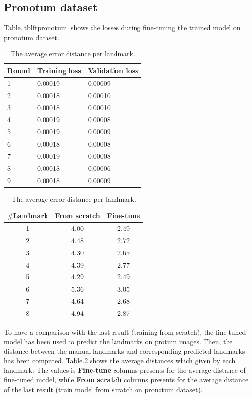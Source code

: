\documentclass[12pt,a4paper]{article}
\begin{document}
\subsection{Pronotum dataset}
Table.\ref{tblftpronotum} shows the losses during fine-tuning the trained model on pronotum dataset.
\begin{table}[htbp]
\begin{minipage}[b]{.5\textwidth}
	\centering
	\begin{tabular}{l l l}
	Round & Training loss & Validation loss \\ \hline
	1 & 0.00019 & 0.00009  \\ \hline
	2 & 0.00018 & 0.00010 \\ \hline
	3 & 0.00018 & 0.00010 \\ \hline
	4 & 0.00019 & 0.00008 \\ \hline
	5 & 0.00019 & 0.00009 \\ \hline
	6 & 0.00018 & 0.00008 \\ \hline
	7 & 0.00019 & 0.00008 \\ \hline
	8 & 0.00018 & 0.00006 \\ \hline
	9 & 0.00018 & 0.00009 \\ \hline
	\end{tabular}
	\caption{The losses during fine-tuning model on pronotum dataset}
	\label{tblftpronotum}
\end{minipage}
\hfill
\begin{minipage}[b]{.5\textwidth}
\centering
\begin{tabular}{|c|c|c|}
\hline
\textbf{$\#$Landmark} & \textbf{From scratch} & \textbf{Fine-tune} \\ \hline
1 & 4.00 & 2.49  \\ \hline
2 & 4.48 & 2.72  \\ \hline
3 & 4.30  & 2.65 \\ \hline
4 & 4.39  & 2.77 \\ \hline
5 & 4.29  & 2.49 \\ \hline
6 & 5.36  & 3.05 \\ \hline
7 & 4.64  & 2.68 \\ \hline
8 & 4.94  & 2.87 \\ \hline
\end{tabular}
\caption{The average error distance per landmark.}
\label{tblcmppronotum}
\end{minipage}
\end{table}

To have a comparison with the last result (training from scratch), the fine-tuned model has been used to predict the landmarks on protum images. Then, the distance between the manual landmarks and corresponding predicted landmarks has been computed. Table.\ref{tblcmppronotum} shows the average distances which given by each landmark. The values is \textbf{Fine-tune} columns presents for the average distance of fine-tuned model, while \textbf{From scratch} columns presents for the average distance of the last result (train model from scratch on pronotum dataset).
\end{document}
